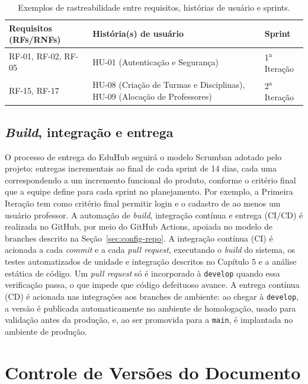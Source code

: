 \begin{table}[ht]
\centering
\caption{Exemplos de rastreabilidade entre requisitos, histórias de usuário e sprints.}
\begin{tabularx}{\textwidth}{p{} X p{}}
\toprule
\textbf{Requisitos (RFs/RNFs)} & \textbf{História(s) de usuário} & \textbf{Sprint} \\
\midrule
RF-01, RF-02, RF-05 & HU-01 (Autenticação e Segurança) & 1\textsuperscript{a} Iteração \\
RF-15, RF-17 & HU-08 (Criação de Turmas e Disciplinas), HU-09 (Alocação de Professores) & 2\textsuperscript{a} Iteração \\
\bottomrule
\end{tabularx}
\end{table}

\section{\textit{Build}, integração e entrega}\label{sec:build-cicd}

O processo de entrega do EduHub seguirá o modelo Scrumban adotado
pelo projeto: entregas incrementais ao final de cada sprint de 14 dias, cada
uma correspondendo a um incremento funcional do produto, conforme o critério
final que a equipe define para cada sprint no planejamento. Por exemplo, a Primeira
Iteração tem como critério final permitir login e o cadastro de ao menos um
usuário professor. A automação de \textit{build}, integração contínua e
entrega (CI/CD) é realizada no GitHub, por meio do GitHub Actions, apoiada no
modelo de branches descrito na Seção~\ref{sec:config-repo}. A integração
contínua (CI) é acionada a cada \textit{commit} e a cada \textit{pull request},
executando o \textit{build} do sistema, os testes automatizados de unidade e
integração descritos no Capítulo 5 e a análise estática de código. Um
\textit{pull request} só é incorporado à \texttt{develop} quando essa
verificação passa, o que impede que código defeituoso avance. A entrega
contínua (CD) é acionada nas integrações aos branches de ambiente: ao chegar à
\texttt{develop}, a versão é publicada automaticamente no ambiente de
homologação, usado para validação antes da produção, e, ao ser promovida para
a \texttt{main}, é implantada no ambiente de produção.

\chapter*{Controle de Versões do Documento}

